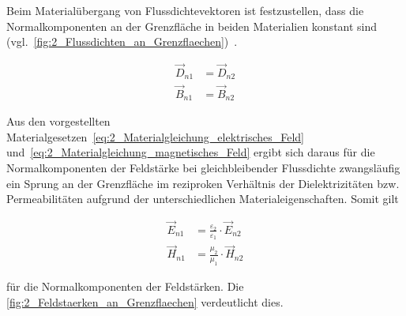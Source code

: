 Beim Materialübergang von Flussdichtevektoren ist festzustellen, dass die Normalkomponenten an der Grenzfläche in beiden Materialien konstant sind (vgl.~\Abb\ref{fig:2_Flussdichten_an_Grenzflaechen})~\cite{EM_Schirmung}.  

\begin{subequations}
\begin{align}
    \vec D_{n1} &= \vec D_{n2} \label{subeq:2_Flussdichtennormale1} \\
    \vec B_{n1} &= \vec B_{n2} \label{subeq:2_Flussdichtennormale2}
\end{align}
\label{eq:2_Flussdichtennormale}
\end{subequations}


Aus den vorgestellten Materialgesetzen~\eqref{eq:2_Materialgleichung_elektrisches_Feld} und~\eqref{eq:2_Materialgleichung_magnetisches_Feld} ergibt sich daraus für die Normalkomponenten der Feldstärke bei gleichbleibender Flussdichte zwangsläufig ein Sprung an der Grenzfläche im reziproken Verhältnis der Dielektrizitäten bzw. Permeabilitäten aufgrund der unterschiedlichen Materialeigenschaften. Somit gilt

\begin{subequations}
\begin{align}
    \vec E_{n1} &= \frac{\varepsilon_2}{\varepsilon_1} \cdot \vec E_{n2} \label{subeq:2_Feldstaerkenormale1} \\
    \vec H_{n1} &= \frac{\mu_2}{\mu_1} \cdot \vec H_{n2} \label{subeq:2_Feldstaerkenormale2}
\end{align}
\label{eq:2_Feldstaerkenormale}
\end{subequations}

für die Normalkomponenten der Feldstärken. Die \Abb\ref{fig:2_Feldstaerken_an_Grenzflaechen} verdeutlicht dies. 

